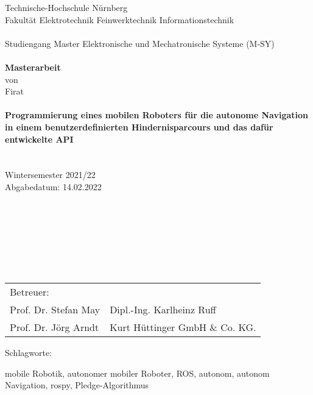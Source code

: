 \documentclass[12pt,a4paper]{scrreprt}
\begin{document}
\begin{titlepage}
    \begin{center}
  	Technische-Hochschule Nürnberg\\
Fakultät Elektrotechnik Feinwerktechnik Informationstechnik\\
\ \\
Studiengang Master Elektronische und Mechatronische Systeme (M-SY)\\
\ \\
\large\textbf{Masterarbeit}\\
von \\
Firat \\ %
\ \\
{\large\textbf{Programmierung eines mobilen Roboters für die autonome Navigation in einem benutzerdefinierten Hindernisparcours und das dafür entwickelte API}}\\
\ \\
\ \\
Wintersemester 2021/22\\
Abgabedatum: 14.02.2022\\
\ \\
\ \\
\ \\  
    
    \end{center}
\ \\
\ \\
\ \\

\begin{tabular}{p{8cm}p{7cm}}\\
Betreuer: & \\
Prof. Dr. Stefan May & Dipl.-Ing. Karlheinz Ruff \\
Prof. Dr. Jörg Arndt & Kurt H\"uttinger GmbH \& Co. KG.\\
\end{tabular}

\begin{labeling}{Schlagworte:}
\item[Schlagworte:] mobile Robotik, autonomer mobiler Roboter, ROS, autonom, autonom Navigation, rospy, Pledge-Algorithmus 
\end{labeling}



\end{titlepage}
\end{document}
